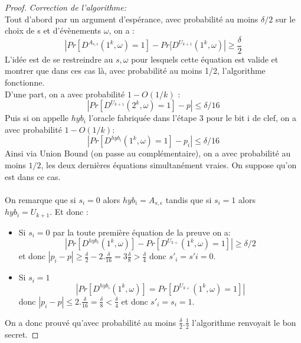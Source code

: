 \documentclass{article}		%
\theoremstyle{definition}
\theoremstyle{plain}
\theoremstyle{plain}
\theoremstyle{plain}
\theoremstyle{plain}
\theoremstyle{plain}
\begin{document}
\begin{framed}
\begin{proof}
\emph{Correction de l'algorithme:}
\\
Tout d'abord par un argument d'espérance, avec probabilité au moins
$\delta/2$ sur le choix de s et d'évènements $\omega$, on a :
$$|Pr[D^{A_{s,\epsilon}}(1^k,\omega)=1]-Pr[D^{U_{k+1}}(1^k,\omega)|\geq
\frac{\delta}{2}$$
L'idée est de se restreindre au $s,\omega$ pour lesquels cette équation est
valide et montrer que dans ces cas là, avec probabilité au moins 1/2,
l'algorithme fonctionne.
\\
D'une part, on a avec probabilité $1-O(1/k)$ :$$|Pr[D^{U_{k+1}}(2^k,\omega)=1]-p|\leq \delta/16 $$
Puis si on appelle $hyb_i$ l'oracle fabriquée dans l'étape 3 pour le bit
i de clef, on a avec
probabilité $1-O(1/k)$:
$$|Pr[D^{hyb_i}(1^k,\omega)=1]-p_i|\leq \delta/16 $$
Ainsi via Union Bound (on passe au complémentaire), on a avec probabilité au moins $1/2$, les deux
dernières équations simultanément vraies. On suppose qu'on est dans ce
cas.\\
\\
On remarque que si $s_i=0$ alors $hyb_i=A_{s,\epsilon}$ tandis que si
$s_i=1$ alors $hyb_i=U_{k+1}$. Et donc :
\begin{itemize}
\item Si $s_i=0$ par la toute première
équation de la preuve on a:
$$ |Pr[D^{hyb_i}(1^k,\omega)]-Pr[D^{U_{k+}}(1^k,\omega)=1]|\geq \delta/2$$ 
et donc $|p_i-p|\geq
\frac{\delta}{2}-2.\frac{\delta}{16}=3\frac{\delta}{8}>\frac{\delta}{4}$ donc
$s'_i=s'i=0$.
\item Si $s_i=1$ 
$$ |Pr[D^{hyb_i}(1^k,\omega)]=Pr[D^{U_{k+}}(1^k,\omega)=1]|$$ donc
$|p_i-p|\leq 2.\frac{\delta}{16} =\frac{\delta}{8} <\frac{\delta} {4}$ et
donc $s'_i=s_i=1$.
\end{itemize}
On a donc prouvé qu'avec probabilité au moins
$\frac{\delta}{2}.\frac{1}{2}$ l'algorithme renvoyait le bon secret.
\end{proof}
\end{framed}
\end{document}
